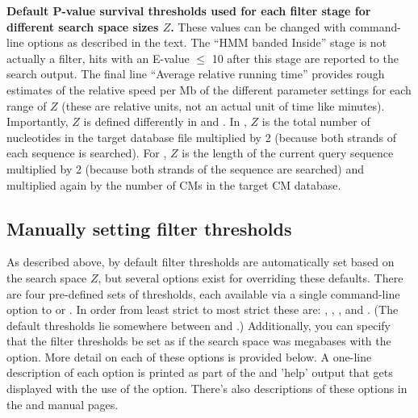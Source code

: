 \begin{center}
\begin{table}
\caption{\textbf{Default P-value survival thresholds used for each
  filter stage for different search space sizes $Z$.} These values can
  be changed with command-line options as described in the text. The
  ``HMM banded Inside'' stage is not actually a filter, hits with an
  E-value $\leq$ 10 after this stage are reported to the search output. 
  The final line ``Average relative running time''
  provides rough estimates of the relative speed per Mb of the different
  parameter settings for each range of $Z$ (these are relative units,
  not an actual unit of time like minutes). Importantly, $Z$ is
  defined differently in  and . In
  , $Z$ is the total number of nucleotides in the
  target database file multiplied by 2 (because both strands of each
  sequence is searched). For , $Z$ is the length of the
  current query sequence multiplied by 2 (because both strands of the
  sequence are searched) and multiplied again by the number of CMs in
  the target CM database.}
\label{tbl:thresholds}
\end{table}
\end{center}

\subsection{Manually setting filter thresholds}

As described above, by default filter thresholds are automatically set
based on the search space $Z$, but several options exist for
overriding these defaults. There are four pre-defined sets of
thresholds, each available via a single command-line option to
 or . In order from least strict to most
strict these are: , , , and
. (The default thresholds lie somewhere between
 and .) Additionally, you can specify that
the filter thresholds be set as if the search space was 
megabases with the  option. More detail on each of
these options is provided below. A one-line description of each option
is printed as part of the  and  'help'
output that gets displayed with the use of the 
option. There's also descriptions of these options in the
 and  manual pages.

